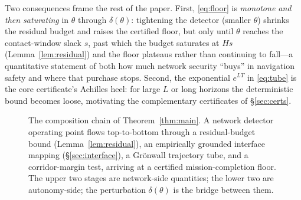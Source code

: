 \documentclass[conference]{IEEEtran}
\newcommand{\MCR}{\mathrm{MCR}}
\begin{document}
Two consequences frame the rest of the paper. First, \eqref{eq:floor} is
\emph{monotone and then saturating} in $\theta$ through $\delta(\theta)$:
tightening the detector (smaller $\theta$) shrinks the residual budget and raises
the certified floor, but only until $\theta$ reaches the contact-window slack
$s$, past which the budget saturates at $Hs$ (Lemma~\ref{lem:residual}) and the
floor plateaus rather than continuing to fall---a quantitative statement of both
how much network security ``buys'' in navigation safety and where that purchase
stops. Second, the exponential $e^{LT}$ in \eqref{eq:tube} is the core
certificate's Achilles heel: for large $L$ or long horizons the deterministic
bound becomes loose, motivating the complementary certificates of
\S\ref{sec:certs}.

\begin{figure}[t]
\centering
{}
\caption{The composition chain of Theorem~\ref{thm:main}. A network detector
operating point flows top-to-bottom through a residual-budget bound
(Lemma~\ref{lem:residual}), an empirically grounded interface mapping
(\S\ref{sec:interface}), a Gr\"onwall trajectory tube, and a corridor-margin
test, arriving at a certified mission-completion floor. The upper two stages are
network-side quantities; the lower two are autonomy-side; the perturbation
$\delta(\theta)$ is the bridge between them.}
\label{fig:chain}
\end{figure}
\end{document}
